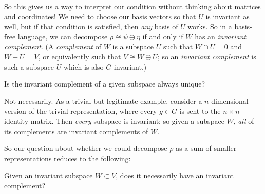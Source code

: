 So this gives us a way to interpret our condition without thinking about matrices and coordinates! We need to choose our basis vectors so that $U$ is invariant as well, but if that condition is satisfied, then \emph{any} basis of $U$ works. So in a basis-free language, we can decompose $\rho \cong \psi \oplus \eta$ if and only if $W$ has an \emph{invariant complement}. (A \emph{complement} of $W$ is a subspace $U$ such that $W \cap U = 0$ and $W + U = V$, or equivalently such that $V \cong W \oplus U$; so an \emph{invariant complement} is such a subspace $U$ which is also $G$-invariant.)




\begin{question}
Is the invariant complement of a given subspace always unique?
\end{question}

\begin{ans}
Not necessarily. As a trivial but legitimate example, consider a $n$-dimensional version of the trivial representation, where every $g \in G$ is sent to the $n \times n$ identity matrix. Then \emph{every} subspace is invariant; so given a subspace $W$, \emph{all} of its complements are invariant complements of $W$. 
\end{ans}

So our question about whether we could decompose $\rho$ as a sum of smaller representations reduces to the following:

\begin{qq}
Given an invariant subspace $W \subset V$, does it necessarily have an invariant complement?
\end{qq}

